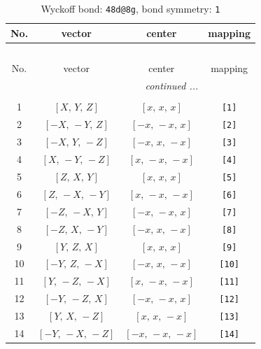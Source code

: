 \documentclass[fleqn,8pt]{jsarticle}
\begin{document}
\begin{longtable}{cccc}
\caption{Wyckoff bond: {\tt 48d@8g}, bond symmetry: {\tt 1}}
 \\
 \hline \hline
No. & vector & center & mapping \\ \hline \endfirsthead

\multicolumn{3}{l}{\tablename\ \thetable{}} \\
 \hline \hline
No. & vector & center & mapping \\ \hline \endhead

 \hline \hline
\multicolumn{3}{r}{\footnotesize\it continued ...} \\ \endfoot

 \hline \hline
\multicolumn{3}{r}{} \\ \endlastfoot

1 & $\left[ X,\, Y,\, Z \right]$ & $\left[ x,\, x,\, x \right]$ & {\tt [1]} \\ \hline
2 & $\left[ - X,\, - Y,\, Z \right]$ & $\left[ - x,\, - x,\, x \right]$ & {\tt [2]} \\ \hline
3 & $\left[ - X,\, Y,\, - Z \right]$ & $\left[ - x,\, x,\, - x \right]$ & {\tt [3]} \\ \hline
4 & $\left[ X,\, - Y,\, - Z \right]$ & $\left[ x,\, - x,\, - x \right]$ & {\tt [4]} \\ \hline
5 & $\left[ Z,\, X,\, Y \right]$ & $\left[ x,\, x,\, x \right]$ & {\tt [5]} \\ \hline
6 & $\left[ Z,\, - X,\, - Y \right]$ & $\left[ x,\, - x,\, - x \right]$ & {\tt [6]} \\ \hline
7 & $\left[ - Z,\, - X,\, Y \right]$ & $\left[ - x,\, - x,\, x \right]$ & {\tt [7]} \\ \hline
8 & $\left[ - Z,\, X,\, - Y \right]$ & $\left[ - x,\, x,\, - x \right]$ & {\tt [8]} \\ \hline
9 & $\left[ Y,\, Z,\, X \right]$ & $\left[ x,\, x,\, x \right]$ & {\tt [9]} \\ \hline
10 & $\left[ - Y,\, Z,\, - X \right]$ & $\left[ - x,\, x,\, - x \right]$ & {\tt [10]} \\ \hline
11 & $\left[ Y,\, - Z,\, - X \right]$ & $\left[ x,\, - x,\, - x \right]$ & {\tt [11]} \\ \hline
12 & $\left[ - Y,\, - Z,\, X \right]$ & $\left[ - x,\, - x,\, x \right]$ & {\tt [12]} \\ \hline
13 & $\left[ Y,\, X,\, - Z \right]$ & $\left[ x,\, x,\, - x \right]$ & {\tt [13]} \\ \hline
14 & $\left[ - Y,\, - X,\, - Z \right]$ & $\left[ - x,\, - x,\, - x \right]$ & {\tt [14]} \\ \hline

\end{longtable}
\end{document}
